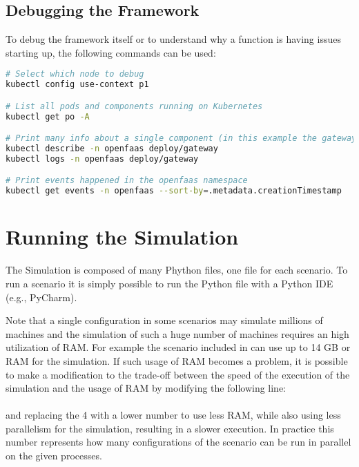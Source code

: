 \subsection{Debugging the Framework}
To debug the framework itself or to understand why a function is having issues starting up, the following commands can be used:
\begin{lstlisting}[language=bash]
# Select which node to debug
kubectl config use-context p1

# List all pods and components running on Kubernetes
kubectl get po -A

# Print many info about a single component (in this example the gateway component)
kubectl describe -n openfaas deploy/gateway
kubectl logs -n openfaas deploy/gateway

# Print events happened in the openfaas namespace
kubectl get events -n openfaas --sort-by=.metadata.creationTimestamp
\end{lstlisting}


\section{Running the Simulation}
The Simulation is composed of many Phython files, one file for each scenario. To run a scenario it is simply possible to run the Python file with a Python IDE (e.g., PyCharm).

Note that a single configuration in some scenarios may simulate millions of machines and the simulation of such a huge number of machines requires an high utilization of RAM.
For example the scenario included in  can use up to 14 GB or RAM for the simulation.
If such usage of RAM becomes a problem, it is possible to make a modification to the trade-off between the speed of the execution of the simulation and the usage of RAM by modifying the following line:\\
\\
and replacing the 4 with a lower number to use less RAM, while also using less parallelism for the simulation, resulting in a slower execution. In practice this number represents how many configurations of the scenario can be run in parallel on the given processes.


